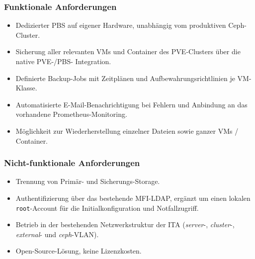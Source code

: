 \subsubsection*{Funktionale Anforderungen}
\begin{itemize}
    \item Dedizierter \acl{PBS} auf eigener Hardware, unabhängig vom
          produktiven Ceph-Cluster.
    \item Sicherung aller relevanten \acp{VM} und Container des
          \ac{PVE}-Clusters über die native \ac{PVE}-/\ac{PBS}-
          Integration.
    \item Definierte Backup-Jobs mit Zeitplänen und
          Aufbewahrungs\-richtlinien je \ac{VM}-Klasse.
    \item Automatisierte E-Mail-Benachrichtigung bei Fehlern und
          Anbindung an das vorhandene Prometheus-Monitoring.
    \item Möglichkeit zur Wiederherstellung einzelner Dateien sowie
          ganzer \acp{VM} / Container.
\end{itemize}

\subsubsection*{Nicht-funktionale Anforderungen}
\begin{itemize}
    \item Trennung von Primär- und Sicherungs-Storage.
    \item Authentifizierung über das bestehende \ac{MFI}-\ac{LDAP},
          ergänzt um einen lokalen \texttt{root}-Account für die
          Initialkonfiguration und Notfallzugriff.
    \item Betrieb in der bestehenden Netzwerkstruktur der \ac{ITA}
          (\emph{server}-, \emph{cluster}-, \emph{external}- und
          \emph{ceph}-\ac{VLAN}).
    \item Open-Source-Lösung, keine Lizenzkosten.
\end{itemize}


